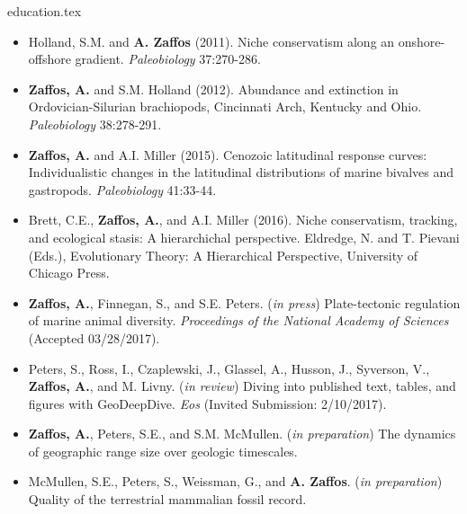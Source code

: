 \documentclass[12pt, a4paper]{awesome-cv}
\newcommand*{\sectiondir}{resume/}
\begin{document}
\makecvheader

{education.tex}
\vspace{-20pt}

\fontsize{10pt}{1em}\bodyfontlight\upshape\color{text}
\begin{itemize}[leftmargin=*]
\item{Holland, S.M. and \textbf{A. Zaffos} (2011). Niche conservatism along an onshore-offshore gradient. \textit{Paleobiology} 37:270-286.}
\item{\textbf{Zaffos, A.} and S.M. Holland (2012). Abundance and extinction in Ordovician-Silurian brachiopods, Cincinnati Arch, Kentucky and Ohio. \textit{Paleobiology} 38:278-291.}
\item{\textbf{Zaffos, A.} and A.I. Miller (2015). Cenozoic latitudinal response curves: Individualistic changes in the latitudinal distributions of marine bivalves and gastropods. \textit{Paleobiology} 41:33-44.}
\item{Brett, C.E., \textbf{Zaffos, A.}, and A.I. Miller (2016). Niche conservatism, tracking, and ecological stasis: A hierarchichal perspective. Eldredge, N. and T. Pievani (Eds.), Evolutionary Theory: A Hierarchical Perspective, University of Chicago Press.}
\item{\textbf{Zaffos, A.}, Finnegan, S., and S.E. Peters. (\textit{in press}) Plate-tectonic regulation of marine animal diversity. \textit{Proceedings of the National Academy of Sciences} (Accepted 03/28/2017).}
\item{Peters, S., Ross, I., Czaplewski, J., Glassel, A., Husson, J., Syverson, V., \textbf{Zaffos, A.}, and M. Livny. (\textit{in review}) Diving into published text, tables, and figures with GeoDeepDive. \textit{Eos} (Invited Submission: 2/10/2017).}
\item{\textbf{Zaffos, A.}, Peters, S.E., and S.M. McMullen. (\textit{in preparation}) The dynamics of geographic range size over geologic timescales.}
\item{McMullen, S.E., Peters, S., Weissman, G., and \textbf{A. Zaffos}. (\textit{in preparation}) Quality of the terrestrial mammalian fossil record.}
\end{itemize}
\end{document}
